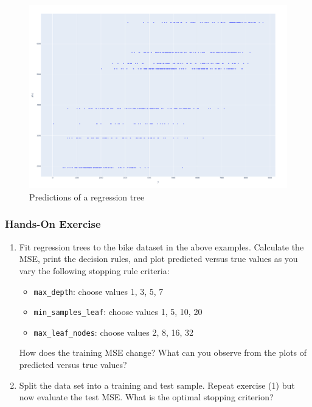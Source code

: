 \begin{figure}
\centering
\includegraphics[width=\textwidth]{tree_fitted_true2.png}
\caption{Predictions of a regression tree}
\label{fig:treescatter}
\end{figure}

\begin{tcolorbox}[colback=code]
\subsubsection*{Hands-On Exercise} 

\begin{enumerate}
\item Fit regression trees to the bike dataset in the above examples. Calculate the MSE, print the decision rules, and plot predicted versus true values as you vary the following stopping rule criteria:
\begin{itemize}
   \item \texttt{max\_depth}: choose values 1, 3, 5, 7
   \item \texttt{min\_samples\_leaf}: choose values 1, 5, 10, 20
   \item \texttt{max\_leaf\_nodes}: choose values 2, 8, 16, 32
\end{itemize}
How does the training MSE change? What can you observe from the plots of predicted versus true values?

\item Split the data set into a training and test sample. Repeat exercise (1) but now evaluate the test MSE. What is the optimal stopping criterion?
\end{enumerate}
\end{tcolorbox}

